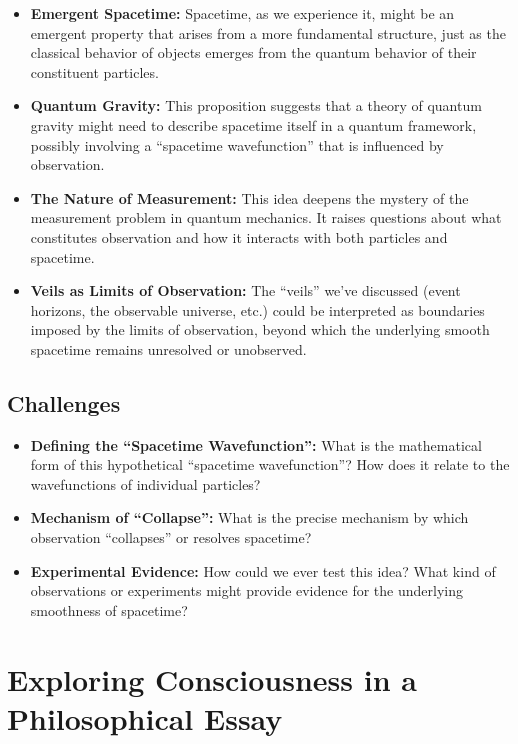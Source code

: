 \documentclass[12pt]{article}
\begin{document}
\begin{itemize}
    \item \textbf{Emergent Spacetime:} Spacetime, as we experience it, might be an emergent property that arises from a more fundamental structure, just as the classical behavior of objects emerges from the quantum behavior of their constituent particles.
    \item \textbf{Quantum Gravity:} This proposition suggests that a theory of quantum gravity might need to describe spacetime itself in a quantum framework, possibly involving a ``spacetime wavefunction'' that is influenced by observation.
    \item \textbf{The Nature of Measurement:} This idea deepens the mystery of the measurement problem in quantum mechanics. It raises questions about what constitutes observation and how it interacts with both particles and spacetime.
    \item \textbf{Veils as Limits of Observation:} The ``veils'' we've discussed (event horizons, the observable universe, etc.) could be interpreted as boundaries imposed by the limits of observation, beyond which the underlying smooth spacetime remains unresolved or unobserved.
\end{itemize}

\subsection{Challenges}

\begin{itemize}
    \item \textbf{Defining the ``Spacetime Wavefunction'':} What is the mathematical form of this hypothetical ``spacetime wavefunction''? How does it relate to the wavefunctions of individual particles?
    \item \textbf{Mechanism of ``Collapse'':} What is the precise mechanism by which observation ``collapses'' or resolves spacetime?
    \item \textbf{Experimental Evidence:} How could we ever test this idea? What kind of observations or experiments might provide evidence for the underlying smoothness of spacetime?
\end{itemize}

\section{Exploring Consciousness in a Philosophical Essay}
\end{document}

